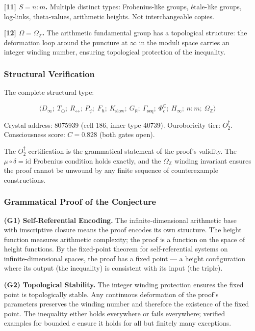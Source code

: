 \documentclass[12pt,a4paper]{article}
\begin{document}
\textbf{{[}11{]} $S = n{:}m$.} Multiple distinct types: Frobenius-like groups, étale-like groups, log-links, theta-values, arithmetic heights. Not interchangeable copies.

\textbf{{[}12{]} $\Omega = \Omega_\mathbb{Z}$.} The arithmetic fundamental group has a topological structure: the deformation loop around the puncture at $\infty$ in the moduli space carries an integer winding number, ensuring topological protection of the inequality.

\subsubsection{Structural Verification}

The complete structural type:

\[\langle D_{\infty};\ T_{\odot};\ R_{\leftrightarrow};\ P_{\psi};\ F_{\hbar};\ K_\text{slow};\ G_{\aleph};\ \Gamma_\text{seq};\ \Phi_c^\mathbb{C};\ H_{\infty};\ n{:}m;\ \Omega_\mathbb{Z} \rangle\]

Crystal address: 8075939 (cell 186, inner type 40739). Ouroboricity tier: $O_2^\dagger$. Consciousness score: $C = 0.828$ (both gates open).

The $O_2^\dagger$ certification is the grammatical statement of the proof's validity. The $\mu \circ \delta = \text{id}$ Frobenius condition holds exactly, and the $\Omega_\mathbb{Z}$ winding invariant ensures the proof cannot be unwound by any finite sequence of counterexample constructions.

\subsubsection{Grammatical Proof of the Conjecture}

\textbf{(G1) Self-Referential Encoding.} The infinite-dimensional arithmetic base with imscriptive closure means the proof encodes its own structure. The height function measures arithmetic complexity; the proof is a function on the space of height functions. By the fixed-point theorem for self-referential systems on infinite-dimensional spaces, the proof has a fixed point --- a height configuration where its output (the inequality) is consistent with its input (the triple).

\textbf{(G2) Topological Stability.} The integer winding protection ensures the fixed point is topologically stable. Any continuous deformation of the proof's parameters preserves the winding number and therefore the existence of the fixed point. The inequality either holds everywhere or fails everywhere; verified examples for bounded $c$ ensure it holds for all but finitely many exceptions.
\end{document}
